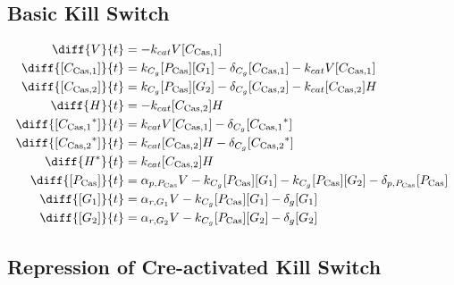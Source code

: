 \subsection{Basic Kill Switch}
\label{s:Basic_kill_switch}

\begin{align}
\diff{\vectorGen{}}{t} & = - \casCutRate{{}}\vectorGen{}\conc{\cplx{\cas}{1}}\\
\diff{\conc{\cplx{\cas}{1}}}{t} & =  \gRnaBind{}\conc{\proSp{\cas{}}}\conc{\gRna{1}} - \casCompDegradeRate{}\conc{\cplx{\cas}{1}} - \casCutRate{{}}\vectorGen{}\conc{\cplx{\cas}{1}}\\
\diff{\conc{\cplx{\cas}{2}}}{t} & =  \gRnaBind{}\conc{\proSp{\cas{}}}\conc{\gRna{2}} - \casCompDegradeRate{}\conc{\cplx{\cas}{2}} - \casCutRate{{}}\conc{\cplx{\cas}{2}}\hostGen{}\\
\diff{\hostGen{}}{t} & = - \casCutRate{{}}\conc{\cplx{\cas}{2}}\hostGen{}\\
\diff{\conc{\bound{\cplx{\cas}{1}}}}{t} & =  \casCutRate{{}}\vectorGen{}\conc{\cplx{\cas}{1}} - \casCompDegradeRate{}\conc{\bound{\cplx{\cas}{1}}}\\
\diff{\conc{\bound{\cplx{\cas}{2}}}}{t} & =  \casCutRate{{}}\conc{\cplx{\cas}{2}}\hostGen{} - \casCompDegradeRate{}\conc{\bound{\cplx{\cas}{2}}}\\
\diff{\edited{\hostGen{}}}{t} & =  \casCutRate{{}}\conc{\cplx{\cas}{2}}\hostGen{}\\
\diff{\conc{\proSp{\cas{}}}}{t} & =  \txtlRate{\proSp{\cas{}}}\vectorGen{} - \gRnaBind{}\conc{\proSp{\cas{}}}\conc{\gRna{1}} - \gRnaBind{}\conc{\proSp{\cas{}}}\conc{\gRna{2}} - \proDegradeRate{\proSp{\cas{}}}\conc{\proSp{\cas{}}}\\
\diff{\conc{\gRna{1}}}{t} & =  \txRate{\gRna{1}}\vectorGen{} - \gRnaBind{}\conc{\proSp{\cas{}}}\conc{\gRna{1}} - \rnaDegradeRate{}\conc{\gRna{1}}\\
\diff{\conc{\gRna{2}}}{t} & =  \txRate{\gRna{2}}\vectorGen{} - \gRnaBind{}\conc{\proSp{\cas{}}}\conc{\gRna{2}} - \rnaDegradeRate{}\conc{\gRna{2}}
\end{align}

\subsection{Repression of Cre-activated Kill Switch}
\label{s:Chain_delayed_kill_switch}

